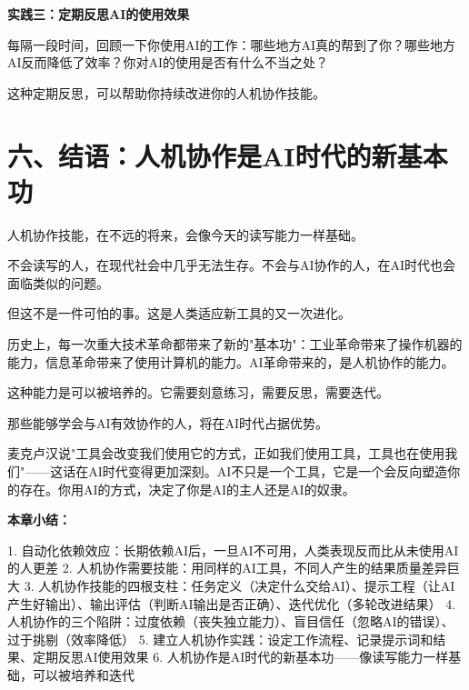 \textbf{实践三：定期反思AI的使用效果}

每隔一段时间，回顾一下你使用AI的工作：哪些地方AI真的帮到了你？哪些地方AI反而降低了效率？你对AI的使用是否有什么不当之处？

这种定期反思，可以帮助你持续改进你的人机协作技能。

\section{六、结语：人机协作是AI时代的新基本功}


人机协作技能，在不远的将来，会像今天的读写能力一样基础。

不会读写的人，在现代社会中几乎无法生存。不会与AI协作的人，在AI时代也会面临类似的问题。

但这不是一件可怕的事。这是人类适应新工具的又一次进化。

历史上，每一次重大技术革命都带来了新的"基本功"：工业革命带来了操作机器的能力，信息革命带来了使用计算机的能力。AI革命带来的，是人机协作的能力。

这种能力是可以被培养的。它需要刻意练习，需要反思，需要迭代。

那些能够学会与AI有效协作的人，将在AI时代占据优势。

麦克卢汉说"工具会改变我们使用它的方式，正如我们使用工具，工具也在使用我们"——这话在AI时代变得更加深刻。AI不只是一个工具，它是一个会反向塑造你的存在。你用AI的方式，决定了你是AI的主人还是AI的奴隶。


\textbf{本章小结：}

1. 自动化依赖效应：长期依赖AI后，一旦AI不可用，人类表现反而比从未使用AI的人更差
2. 人机协作需要技能：用同样的AI工具，不同人产生的结果质量差异巨大
3. 人机协作技能的四根支柱：任务定义（决定什么交给AI）、提示工程（让AI产生好输出）、输出评估（判断AI输出是否正确）、迭代优化（多轮改进结果）
4. 人机协作的三个陷阱：过度依赖（丧失独立能力）、盲目信任（忽略AI的错误）、过于挑剔（效率降低）
5. 建立人机协作实践：设定工作流程、记录提示词和结果、定期反思AI使用效果
6. 人机协作是AI时代的新基本功——像读写能力一样基础，可以被培养和迭代
